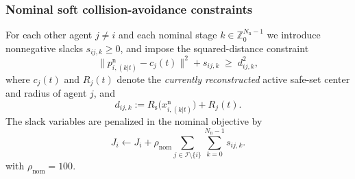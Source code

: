 \documentclass[twocolumn]{autart}
\begin{document}
\subsubsection*{Nominal soft collision-avoidance constraints}
For each other agent $j\neq i$ and each nominal stage $k\in\mathbb{Z}_0^{N_{\mathrm n}-1}$ we introduce nonnegative slacks
$s_{ij,k}\ge 0$, and impose the squared-distance constraint
\begin{equation}
\|p^{\mathrm n}_{i,(k|t)}-c_j(t)\|^2 + s_{ij,k}
\;\ge\;
d_{ij,k}^2,
\label{eq:soft_dist_gate}
\end{equation}
where $c_j(t)$ and $R_j(t)$ denote the \emph{currently reconstructed} active safe-set center and radius of agent $j$, and
\[
d_{ij,k}
:=
R_{\mathrm{s}}\big(x^{\mathrm n}_{i,(k|t)}\big) + R_j(t).
\]
The slack variables are penalized in the nominal objective by
\[
J_i \leftarrow J_i
+
\rho_{\mathrm{nom}}
\sum_{j\in\mathcal I\setminus\{i\}}
\sum_{k=0}^{N_{\mathrm n}-1}
s_{ij,k}.
\]
with $\rho_{\mathrm{nom}}=100$. 
\end{document}
